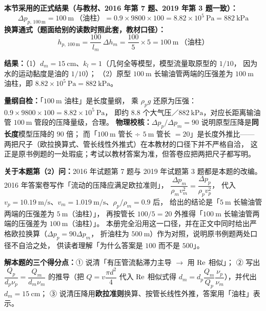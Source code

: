 \begin{jie}
\textbf{本节采用的正式结果（与教材、2016 年第 7 题、2019 年第 3 题一致）：}
\[ \boxed{\,\Delta p_{p,\,100\,\mathrm{m}}
   =100\ \mathrm{m}\ \text{（油柱）}
   =0.9\times9800\times100
   =8.82\times10^{5}\ \mathrm{Pa}=882\ \mathrm{kPa}\,} \]
\textbf{换算通式（题面给别的读数时照此套，教材口径）：}
\[ \boxed{\,h_{p,\,100\,\mathrm{m}}
   =\frac{100}{l_m}\,\Delta h_m
   =\frac{100}{5}\times5=100\ \mathrm{m}\ \text{（油柱）}\,} \]

\textbf{结果：}（1）$d_m=15\ \mathrm{cm}$、$k_l=1$（几何全等模型，模型流量取原型的 $1/10$，
因为水的运动黏度是油的 $1/10$）；
（2）原型 $100\ \mathrm{m}$ 长输油管两端的压强差为 $100\ \mathrm{m}$ 油柱，即 $8.82\times10^{5}\ \mathrm{Pa}=882\ \mathrm{kPa}$。

\textbf{量纲自检：}「$100\ \mathrm{m}$ 油柱」是长度量纲，
乘 $\rho_p g$ 还原为压强：$0.9\times9800\times100=8.82\times10^{5}\ \mathrm{Pa}$，
即约 $8.8$ 个大气压／$882\ \mathrm{kPa}$，对应长距离输油管 $100\ \mathrm{m}$ 管段的压降量级，合理。
\textbf{物理校核：}$\Delta p_p/\Delta p_m=90$ 说明原型压降是\textbf{同长度}模型压降的 $90$ 倍；
而「$100\ \mathrm{m}$ 管长 ÷ $5\ \mathrm{m}$ 管长 $=20$」是长度外推比——
两把尺子（欧拉换算式、管长线性外推式）在本教材的口径下并不严格自洽，
这正是原书例题的一处瑕疵；考试以教材答案为准，但答卷应把两把尺子都写明。
\end{jie}

\begin{tishi}
\textbf{关于本题第（2）问：}2016 年试题第 7 题与 2019 年试题第 3 题都是本题的改编。
2016 年答案卷写作「流动的压降应满足欧拉准则」，
$\dfrac{\Delta p_m}{\rho_m v_m^{2}}=\dfrac{\Delta p_p}{\rho_p v_p^{2}}$，
代入 $v_p=10.19\ \mathrm{m/s}$、$v_m=1.019\ \mathrm{m/s}$、$\rho_p/\rho_m=0.9$ 后，
给出的结论是「$5\ \mathrm{m}$ 长输油管两端的压强差为 $5\ \mathrm{m}$（油柱）」，
再按管长 $100/5=20$ 外推得「$100\ \mathrm{m}$ 长输油管两端的压强差为 $100\ \mathrm{m}$（油柱）」。
本册完全沿用这一口径，并在正文中同时给出严格欧拉换算（$\Delta p_p=90\Delta p_m$，
折油柱为 $500\ \mathrm{m}$）作为对照，说明原书例题两处口径不自洽之处，
供读者理解「为什么答案是 $100$ 而不是 $500$」。

\textbf{解本题的三个得分点：}① 说清「有压管流黏滞力主导 $\to$ 用 $\mathrm{Re}$ 相似」；
② 写出 $\dfrac{Q_p}{d_p\nu_p}=\dfrac{Q_m}{d_m\nu_m}$ 的推导（把 $Q=v\dfrac{\pi d^{2}}{4}$ 代入 $\mathrm{Re}$ 相似式得 $d_m=d_p\dfrac{Q_m}{Q_p}\dfrac{\nu_p}{\nu_m}$），并代出 $d_m=15\ \mathrm{cm}$；
③ 说清压降用\textbf{欧拉准则}换算、按管长线性外推，答案用「油柱」表示。
\end{tishi}

